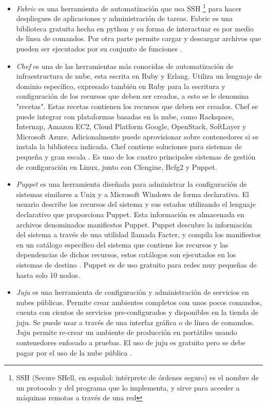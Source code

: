 \documentclass[conference, spanish]{IEEEtran}
\begin{document}
\begin{itemize}
\item \emph{Fabric} es una herramienta de automatización que usa SSH \footnote{SSH (Secure SHell, en español: intérprete de órdenes seguro) es el nombre de un protocolo y del programa que lo implementa, y sirve para acceder a máquinas remotas a través de una red} para hacer despliegues de aplicaciones y administración de tareas. Fabric es una biblioteca gratuita hecha en python y su forma de interactuar es por medio de línea de comandos. Por otra parte permite cargar y descargar archivos que pueden ser ejecutados por su conjunto de funciones \cite{fabfile16}.

\item \emph{Chef} es una de las herramientas más conocidas de automatización de infraestructura de nube, esta escrita en Ruby y Erlang. Utiliza un lenguaje de dominio específico, expresado también en Ruby para la escritura y configuración de los recursos que deben ser creados, a esto se le denomina "recetas". Estas recetas contienen los recursos que deben ser creados. Chef se puede integrar con plataformas basadas en la nube, como Rackspace, Internap, Amazon EC2, Cloud Platform Google, OpenStack, SoftLayer y Microsoft Azure. Adicionalmente puede aprovisionar sobre contenedores si se instala la biblioteca indicada. Chef contiene soluciones para sistemas de pequeña y gran escala \cite{Chef15}. Es uno de los cuatro principales sistemas de gestión de configuración en Linux, junto con Cfengine, Bcfg2 y Puppet.

\item \emph{Puppet} es una herramienta diseñada para administrar la configuración de sistemas similares a Unix y a Microsoft Windows de forma declarativa. El usuario describe los recursos del sistema y sus estados utilizando el lenguaje declarativo que proporciona Puppet. Esta información es almacenada en archivos denominados manifiestos Puppet. Puppet descubre la información del sistema a través de una utilidad llamada Facter, y compila los manifiestos en un catálogo específico del sistema que contiene los recursos y las dependencias de dichos recursos, estos catálogos son ejecutados en los sistemas de destino \cite{Pupet15}. Puppet es de uso gratuito para redes muy pequeñas de hasta solo 10 nodos.

\item \emph{Juju} es una herramienta de configuración y administración de servicios en nubes públicas. Permite crear ambientes completos con unos pocos comandos, cuenta con cientos de servicios pre-configurados y disponibles en la tienda de juju. Se puede usar a través de una interfaz gráfica o de línea de comandos. Juju permite re-crear un ambiente de producción en portátiles usando contenedores enfocado a pruebas. El uso de juju es gratuito pero se debe pagar por el uso de la nube pública \cite{juju16}.


\end{itemize}
\end{document}
